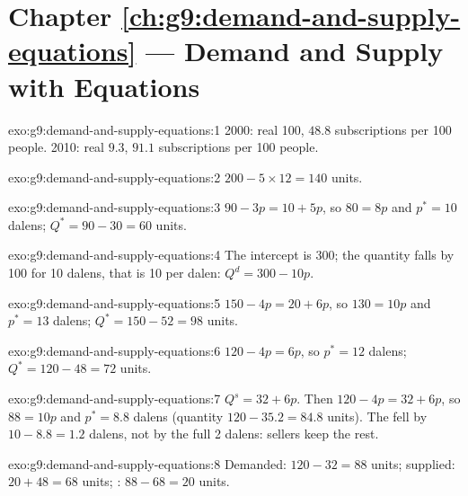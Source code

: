 \section*{Chapter \ref{ch:g9:demand-and-supply-equations} --- Demand and Supply with Equations}

\begin{solution}{exo:g9:demand-and-supply-equations:1}
2000: real  100, $48.8$ subscriptions per 100 people. 2010: real  $9.3$, $91.1$ subscriptions
per 100 people.
\end{solution}

\begin{solution}{exo:g9:demand-and-supply-equations:2}
$200 - 5 \times 12 = 140$ units.
\end{solution}

\begin{solution}{exo:g9:demand-and-supply-equations:3}
$90 - 3p = 10 + 5p$, so $80 = 8p$ and $p^* = 10$ dalens; $Q^* = 90 - 30 = 60$ units.
\end{solution}

\begin{solution}{exo:g9:demand-and-supply-equations:4}
The intercept is 300; the quantity falls by 100 for 10 dalens, that is 10 per dalen: $Q^d = 300 - 10p$.
\end{solution}

\begin{solution}{exo:g9:demand-and-supply-equations:5}
$150 - 4p = 20 + 6p$, so $130 = 10p$ and $p^* = 13$ dalens; $Q^* = 150 - 52 = 98$ units.
\end{solution}

\begin{solution}{exo:g9:demand-and-supply-equations:6}
$120 - 4p = 6p$, so $p^* = 12$ dalens; $Q^* = 120 - 48 = 72$ units.
\end{solution}

\begin{solution}{exo:g9:demand-and-supply-equations:7}
$Q^s = 32 + 6p$. Then $120 - 4p = 32 + 6p$, so $88 = 10p$ and $p^* = 8.8$ dalens (quantity $120 - 35.2 =
84.8$ units). The  fell by $10 - 8.8 = 1.2$ dalens, not by the full 2 dalens: sellers keep the
rest.
\end{solution}

\begin{solution}{exo:g9:demand-and-supply-equations:8}
Demanded: $120 - 32 = 88$ units; supplied: $20 + 48 = 68$ units; : $88 - 68 = 20$ units.
\end{solution}

